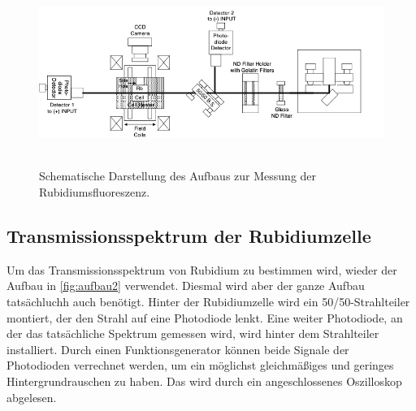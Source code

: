 \begin{figure}
    \centering
    \includegraphics[height=6cm]{content/pics/aufbau.png}
    \caption{Schematische Darstellung des Aufbaus zur Messung der Rubidiumsfluoreszenz. \cite{V60}}
    \label{fig:aufbau2}
\end{figure}

\subsection{Transmissionsspektrum der Rubidiumzelle}
\label{sec:Transmissionsspektrum}
Um das Transmissionsspektrum von Rubidium zu bestimmen wird, wieder der Aufbau in \autoref{fig:aufbau2} verwendet.
Diesmal wird aber der ganze Aufbau tatsächluchh auch benötigt. Hinter der Rubidiumzelle wird ein 
50/50-Strahlteiler montiert, der den Strahl auf eine Photodiode lenkt. Eine weiter Photodiode, an der das
tatsächliche Spektrum gemessen wird, wird hinter dem Strahlteiler installiert. Durch einen Funktionsgenerator können
beide Signale der Photodioden verrechnet werden, um ein möglichst gleichmäßiges und geringes Hintergrundrauschen
zu haben. Das wird durch ein angeschlossenes Oszilloskop abgelesen.